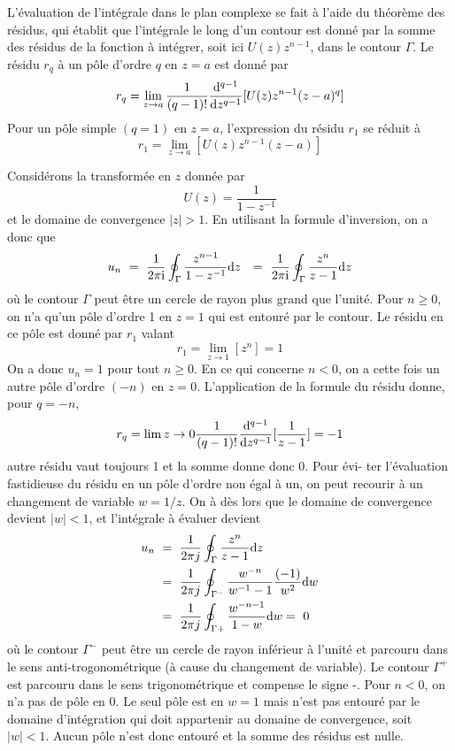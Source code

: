 L'\'{e}valuation de l'int\'{e}grale dans le plan complexe se fait \`{a} l'aide du th\'{e}or\`{e}me des r\'{e}sidus, qui \'{e}tablit que l'int\'{e}grale le long d'un contour est donn\'{e} par la somme des r\'{e}sidus de la fonction \`{a} int\'{e}grer, soit ici $U(z)z^{n-1}$, dans le contour $\Gamma$. Le r\'{e}sidu $r_{q}$ \`{a} un p\^{o}le d'ordre $q$ en $z=a$ est donn\'{e} par
\begin{equation}
\label{eq:residu-q}
r_{q}=\lim_{z\rightarrow a}\frac{1}{(q-1)!}\frac{\mathrm{d} ^{q-1}}{\mathrm{d} z^{q-1}}[U(z)z^{n-1}(z-a)^{q}]
\end{equation}
Pour un p\^{o}le simple $(q=1)$ en $z=a$, l'expression du r\'{e}sidu $r_{1}$ se r\'{e}duit \`{a}
\begin{equation}
\label{eq:residu-simple}
r_{1}=\lim_{z\rightarrow a}[U(z)z^{n-1}(z-a)]
\end{equation}
\begin{example}
Consid\'{e}rons la transform\'{e}e en $z$ donn\'{e}e par
$$
U(z)=\frac{1}{1-z^{-1}}
$$
et le domaine de convergence $|z|>1$. En utilisant la formule d'inversion, on a donc que
\begin{align*}
u_n\ &=\ \frac{1}{2\pi \mathrm{i}}\oint_{\Gamma}\frac{z^{n-1}}{1-z^{-1}}\mathrm{d} z
&=\ \frac{1}{2\pi \mathrm{i}}\oint_{\Gamma}\frac{z^{n}}{z-1}\mathrm{d} z
\end{align*}
o\`{u} le contour $\Gamma$ peut \^{e}tre un cercle de rayon plus grand que l'unit\'{e}. Pour $n\geq 0$, on n'a qu'un p\^{o}le d'ordre 1 en $z=1$ qui est entour\'{e} par le contour. Le r\'{e}sidu en ce p\^{o}le est donn\'{e} par $r_{1}$ valant
$$
r_{1}=\lim_{z\rightarrow 1}[z^{n}]=1
$$
On a donc $u_n=1$ pour tout $n \geq 0$. En ce qui concerne $n<0$, on a cette fois un autre p\^{o}le d'ordre $(-n)$ en $z=0$.
L'application de la formule du r\'{e}sidu donne, pour $q=-n$,
$$
 r_{q}=\lim {z\rightarrow 0} \frac{1}{(q-1)!}\frac{\mathrm{d} ^{q-1}}{\mathrm{d} z^{q-1}}[\frac{1}{z-1}]=-1
$$
autre r\'{e}sidu vaut toujours 1 et la somme donne donc $0$.
Pour \'{e}vi- ter l'\'{e}valuation fastidieuse du r\'{e}sidu en un p\^{o}le d'ordre non \'{e}gal \`{a} un, on peut recourir \`{a} un changement de variable $w=1/z$. On \`{a} d\`{e}s lors que le domaine de convergence devient $|w|<1$, et l'int\'{e}grale \`{a} \'{e}valuer devient
\begin{align*}
u_n\ &=\ \frac{1}{2\pi j}\oint_{\Gamma}\frac{z^{n}}{z-1}\mathrm{d}  z \\
     &=\ \frac{1}{2\pi j}\oint_{\Gamma^{-}}\frac{w^{-n}}{w^{-1}-1}\frac{(-1)}{w^{2}}\mathrm{d} w\\
     &=\ \frac{1}{2\pi j}\oint_{\Gamma+}\frac{w^{-n-1}}{1-w}\mathrm{d}  w =\ 0
\end{align*}
o\`{u} le contour $\Gamma^{-}$ peut \^{e}tre un cercle de rayon inf\'{e}rieur \`{a} l'unit\'{e} et parcouru dans le sens anti-trogonométrique (à cause du changement de variable). Le contour $\Gamma^{+}$ est parcouru dans le sens trigonométrique et compense le signe -. Pour $n<0$, on n'a pas de p\^{o}le en $0$. Le seul p\^{o}le est en $w=1$ mais n'est pas entour\'{e} par le domaine d'int\'{e}gration qui doit appartenir au domaine de convergence, soit $|w|<1$. Aucun p\^{o}le n'est donc entour\'{e} et la somme des r\'{e}sidus est nulle.
\end{example}
